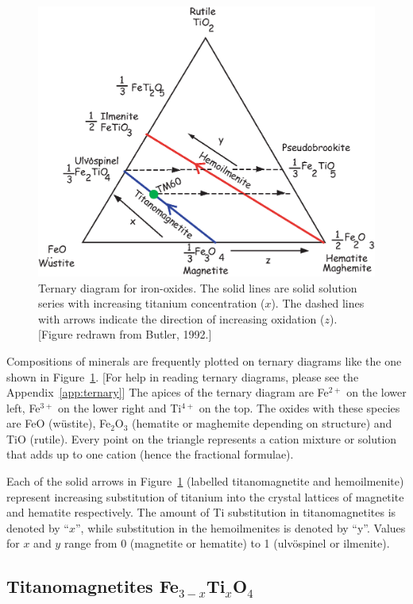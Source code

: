  
 
\begin{figure}[htb]
\centering  \includegraphics[width=3 in]{EPSfiles/tern.eps}
\caption{Ternary diagram for iron-oxides.
The solid lines are solid solution series with increasing titanium concentration ($x$). 
The dashed lines with arrows indicate the direction of increasing
oxidation ($z$). [Figure redrawn from  Butler, 1992.] }
\label{fig:tern}
\end{figure}
 \nocite{oreilly84}

Compositions of minerals are frequently plotted on 
ternary diagrams like the one shown in Figure~\ref{fig:tern}.  [For help in reading ternary diagrams, please see the Appendix~\ref{app:ternary}]  
The apices of the ternary diagram are Fe$^{2+}$ on the lower left, Fe$^{3+}$ on the lower right and Ti$^{4+}$ on the top.   The oxides with these species are FeO (w\"ustite),  Fe$_2$O$_3$ (hematite or maghemite depending on structure) and TiO (rutile).  Every point on the triangle represents a cation mixture or solution that adds up to one cation (hence the fractional formulae).  

Each of the solid arrows in Figure~\ref{fig:tern} (labelled titanomagnetite and hemoilmenite) represent
increasing substitution of titanium into the crystal lattices of magnetite and
hematite respectively.
  The amount of Ti substitution in
titanomagnetites is denoted by ``$x$'', while substitution in the
hemoilmenites is denoted by ``y''.
Values for $x$ and $y$  range from 0 (magnetite or hematite) to 1 
(ulv\"ospinel or ilmenite).    






\subsection {Titanomagnetites Fe$_{3-x}$Ti$_x$O$_4$} 
\label{sect:titano}


